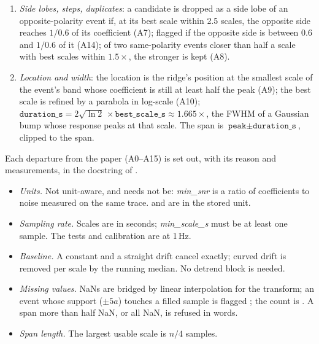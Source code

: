 \begin{enumerate}
  pass~2 re-measures with pass~1's events left out of the windows and judges at \emph{min\_snr}.
  The paper's noise, the 95th percentile of $|$coefficients$|$ at the smallest scale, is kept per
  event as the diagnostic .
\item \emph{Side lobes, steps, duplicates}: a candidate is dropped as a side lobe of an
  opposite-polarity event if, at its best scale within 2.5 scales, the opposite side reaches
  $1/0.6$ of its coefficient (A7); flagged  if the opposite side is between 0.6
  and $1/0.6$ of it (A14); of two same-polarity events closer than half a scale with best scales
  within $1.5\times$, the stronger is kept (A8).
\item \emph{Location and width}: the location is the ridge's position at the smallest scale of
  the event's band whose coefficient is still at least half the peak (A9); the best scale is
  refined by a parabola in log-scale (A10); $\texttt{duration\_s} = 2\sqrt{\ln2}\,\times
  \texttt{best\_scale\_s} \approx 1.665\times$, the FWHM of a Gaussian bump whose response peaks
  at that scale. The span is $\texttt{peak} \pm \texttt{duration\_s}$, clipped to the span.
\end{enumerate}
Each departure from the paper (A0--A15) is set out, with its reason and measurements, in the
docstring of .

\begin{itemize}
\item \emph{Units.} Not unit-aware, and needs not be: \emph{min\_snr} is a ratio of
  coefficients to noise measured on the same trace.  and  are in the
  stored unit.
\item \emph{Sampling rate.} Scales are in seconds; \emph{min\_scale\_s} must be at least one
  sample. The tests and calibration are at 1\,Hz.
\item \emph{Baseline.} A constant and a straight drift cancel exactly; curved drift is removed
  per scale by the running median. No detrend block is needed.
\item \emph{Missing values.} NaNs are bridged by linear interpolation for the transform; an
  event whose support ($\pm5a$) touches a filled sample is flagged ; the
  count is . A span more than half NaN, or all NaN, is refused in words.
\item \emph{Span length.} The largest usable scale is $n/4$ samples.
\end{itemize}

